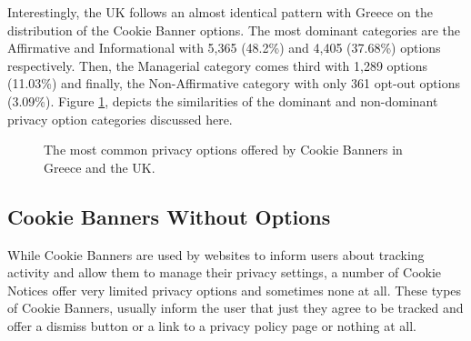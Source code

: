 \documentclass[../main.tex]{subfiles}
\begin{document}
Interestingly, the UK follows an almost identical pattern with Greece on the distribution of the Cookie Banner options. The most dominant categories are the Affirmative and Informational with 5,365 (48.2\%) and 4,405 (37.68\%) options respectively. Then, the Managerial category comes third with 1,289 options (11.03\%) and finally, the Non-Affirmative category with only 361 opt-out options (3.09\%). Figure \ref{fig:priv_categories_breakdown}, depicts the similarities of the dominant and non-dominant privacy option categories discussed here. 

\categories

\begin{figure}[ht]
    \centering
    \caption{The most common privacy options offered by Cookie Banners in Greece and the UK.}
    \label{fig:priv_categories_breakdown}
\end{figure}

\subsection{Cookie Banners Without Options}

While Cookie Banners are used by websites to inform users about tracking activity and allow them to manage their privacy settings, a number of Cookie Notices offer very limited privacy options and sometimes none at all. These types of Cookie Banners, usually inform the user that just  they agree to be tracked and offer a dismiss button or a link to a privacy policy page or nothing at all.
\end{document}

